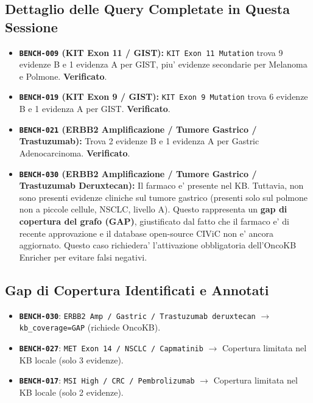 \documentclass[12pt, a4paper]{article}
\newcommand{\pass}[1]{{\color{passgreen}\textbf{#1}}}
\newcommand{\bench}[1]{{\texttt{\textbf{#1}}}}
\begin{document}
\subsection{Dettaglio delle Query Completate in Questa Sessione}
\begin{itemize}[leftmargin=1.6em, itemsep=3pt]
  \item \textbf{\bench{BENCH-009} (KIT Exon 11 / GIST):} \texttt{KIT Exon 11 Mutation} trova 9 evidenze B e 1 evidenza A per GIST, piu' evidenze secondarie per Melanoma e Polmone. \pass{Verificato}.
  \item \textbf{\bench{BENCH-019} (KIT Exon 9 / GIST):} \texttt{KIT Exon 9 Mutation} trova 6 evidenze B e 1 evidenza A per GIST. \pass{Verificato}.
  \item \textbf{\bench{BENCH-021} (ERBB2 Amplificazione / Tumore Gastrico / Trastuzumab):} Trova 2 evidenze B e 1 evidenza A per Gastric Adenocarcinoma. \pass{Verificato}.
  \item \textbf{\bench{BENCH-030} (ERBB2 Amplificazione / Tumore Gastrico / Trastuzumab Deruxtecan):} Il farmaco e' presente nel KB. Tuttavia, non sono presenti evidenze cliniche sul tumore gastrico (presenti solo sul polmone non a piccole cellule, NSCLC, livello A).
        Questo rappresenta un \textbf{gap di copertura del grafo (GAP)}, giustificato dal fatto che il farmaco e' di recente approvazione e il database open-source CIViC non e' ancora aggiornato. Questo caso richiedera' l'attivazione obbligatoria dell'OncoKB Enricher per evitare falsi negativi.
\end{itemize}

\subsection{Gap di Copertura Identificati e Annotati}
\begin{itemize}[leftmargin=1.6em, itemsep=2pt]
  \item \bench{BENCH-030}: \texttt{ERBB2 Amp / Gastric / Trastuzumab deruxtecan} $\to$ \texttt{kb\_coverage=GAP} (richiede OncoKB).
  \item \bench{BENCH-027}: \texttt{MET Exon 14 / NSCLC / Capmatinib} $\to$ Copertura limitata nel KB locale (solo 3 evidenze).
  \item \bench{BENCH-017}: \texttt{MSI High / CRC / Pembrolizumab} $\to$ Copertura limitata nel KB locale (solo 2 evidenze).
\end{itemize}

\end{document}
